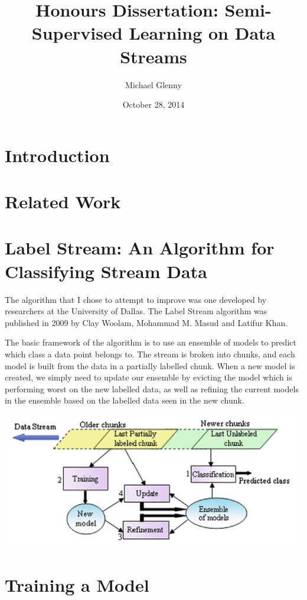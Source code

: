 \documentclass[12pt,a4paper,oneside]{report}
\begin{document}
\title{Honours Dissertation: Semi-Supervised Learning on Data Streams}
\author{Michael Glenny}
\date{October 28, 2014}
\maketitle

\section{Introduction}
\section{Related Work}
\section{Label Stream: An Algorithm for Classifying Stream Data}

The algorithm that I chose to attempt to improve was one developed by researchers at the University of Dallas. The Label Stream algorithm was published in 2009 by Clay Woolam, Mohammad M. Masud and Latifur Khan.\cite{LabStr}

The basic framework of the algorithm is to use an ensemble of models to predict which class a data point belongs to. The stream is broken into chunks, and each model is built from the data in a partially labelled chunk. When a new model is created, we simply need to update our ensemble by evicting the model which is performing worst on the new labelled data, as well as refining the current models in the ensemble based on the labelled data seen in the new chunk. 

\includegraphics[scale = 0.4]{LabStrOverview}
\cite{TechRep}


\section{Training a Model}
\end{document}
